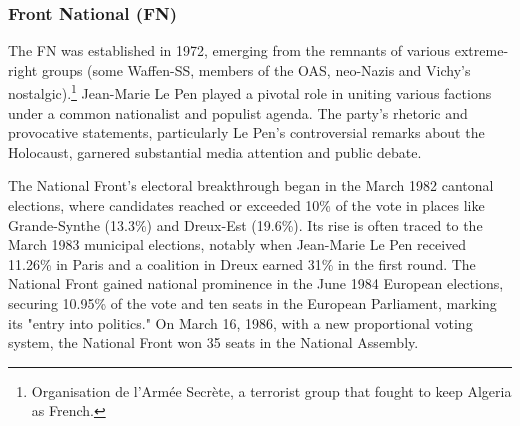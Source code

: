 \subsubsection{Front National (FN)}

The FN was established in 1972, emerging from the remnants of various extreme-right groups (some Waffen-SS, members of the OAS, neo-Nazis and Vichy's nostalgic).\footnote{Organisation de l'Armée Secrète, a terrorist group that fought to keep Algeria as French.} Jean-Marie Le Pen played a pivotal role in uniting various factions under a common nationalist and populist agenda. The party's rhetoric and provocative statements, particularly Le Pen's controversial remarks about the Holocaust, garnered substantial media attention and public debate.

The National Front's electoral breakthrough began in the March 1982 cantonal elections, where candidates reached or exceeded 10\% of the vote in places like Grande-Synthe (13.3\%) and Dreux-Est (19.6\%). Its rise is often traced to the March 1983 municipal elections, notably when Jean-Marie Le Pen received 11.26\% in Paris and a coalition in Dreux earned 31\% in the first round. The National Front gained national prominence in the June 1984 European elections, securing 10.95\% of the vote and ten seats in the European Parliament, marking its "entry into politics." On March 16, 1986, with a new proportional voting system, the National Front won 35 seats in the National Assembly.

